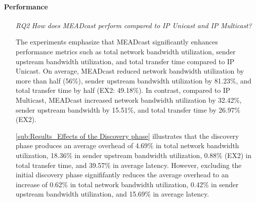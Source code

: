 \paragraph{Performance} %
\label{par:discussion_Performance}
\begin{itemize}
\item[\textit{RQ2}]
    \textit{How does MEADcast perform compared to IP Unicast and IP Multicast?}
    

    The experiments emphasize that MEADcast significantly enhances performance
        metrics such as total network bandwidth utilization, sender upstream
        bandwidth utilization, and total transfer time compared to IP Unicast.
    On average, MEADcast reduced network bandwidth utilization by more than
        half (56\%), sender upstream bandwidth utilization by 81.23\%, and
        total transfer time by half (EX2: 49.18\%).
    In contrast, compared to IP Multicast, MEADcast increased network bandwidth
        utilization by 32.42\%, sender upstream bandwidth by 15.51\%, and total
        transfer time by 26.97\% (EX2).

    \autoref{sub:Results_Effects of the Discovery phase} illustrates that the discovery
        phase produces an average overhead of 4.69\% in total network bandwidth
        utilization, 18.36\% in sender upstream bandwidth utilization, 0.88\%
        (EX2) in total transfer time, and 39.57\% in average latency.
    However, excluding the initial discovery phase signififantly reduces the 
        average overhead to an increase of 0.62\% in total network bandwidth
        utilization, 0.42\% in sender upstream bandwidth utilization, and
        15.69\% in average latency.


\end{itemize}
